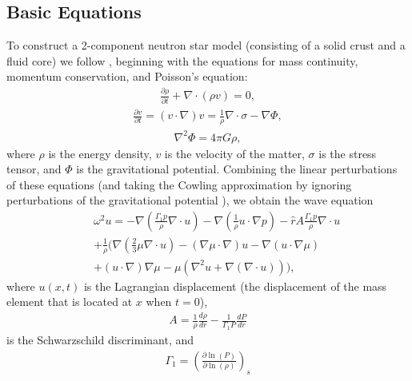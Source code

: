 \documentclass[fleqn,usenatbib]{mnras}
\begin{document}
\subsection{Basic Equations}
\hspace{\parindent}To construct a 2-component neutron star model (consisting of a solid crust and a fluid core) we follow \citet{mcdermott1988nonradial}, beginning with the equations for mass continuity, momentum conservation, and Poisson's equation:%
\begin{align}
\frac{\partial\rho}{\partial t}+\nabla\cdot(\rho v)=0,
\label{eq:continuity_eqn}
\end{align}
\begin{align}
\frac{\partial v}{\partial t}=(v\cdot \nabla)v=\frac{1}{\rho}\nabla\cdot\sigma-\nabla\Phi,
\label{eq:momentum_eqn}
\end{align}
\begin{align}
\nabla^2\Phi=4\pi G\rho,
\label{eq:Poisson_eqn}
\end{align}
\noindent where $\rho$ is the energy density, $v$ is the velocity of the matter, $\sigma$ is the stress tensor, and $\Phi$ is the gravitational potential. Combining the linear perturbations of these equations (and taking the Cowling approximation by ignoring perturbations of the gravitational potential \citet{cowling1941non}), we obtain the wave equation
\begin{align}\nonumber
&&\omega^2u=-\nabla\left(\frac{\Gamma_1 p}{\rho}\nabla\cdot u\right)-\nabla\left(\frac{1}{\rho}u\cdot\nabla p\right)-\hat{r}A\frac{\Gamma_1 p}{\rho}\nabla\cdot u\\\nonumber
&&+\frac{1}{\rho}\biggr(\nabla\left(\frac{2}{3}\mu\nabla\cdot u\right)-\left(\nabla\mu\cdot\nabla\right)u-\nabla\left(u\cdot\nabla\mu\right)\\
&&+\left(u\cdot\nabla\right)\nabla\mu-\mu\left(\nabla^2 u+\nabla\left(\nabla\cdot u\right)\right)\biggr),
\label{eq:wave_eqn}
\end{align}
where $u(x,t)$ is the Lagrangian displacement (the displacement of the mass element that is located at $x$ when $t=0$),%
\begin{align}
A=\frac{1}{\rho}\frac{d\rho}{dr}-\frac{1}{\Gamma_1P}\frac{dP}{dr}
\label{eq:schwartz_descrim}
\end{align}
\noindent is the Schwarzschild discriminant, and
\begin{align}
\Gamma_1=\left(\frac{\partial\ln(P)}{\partial\ln(\rho)}\right)_s
\label{eq:adiabatic_index}
\end{align}
\end{document}
